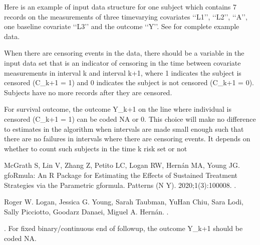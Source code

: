 \documentclass[letterpaper,10pt,english]{sphinxmanual}
\begin{document}
\sphinxAtStartPar
Here is an example of input data structure for one subject which contains 7 records on
the measurements of three time\sphinxhyphen{}varying covariates ‘‘L1’’, ‘‘L2’’, ‘‘A’’,
one baseline covariate ‘‘L3’’ and the outcome ‘‘Y’’. See  for complete example data.
\begin{quote}

\end{quote}

\sphinxAtStartPar
{} When there are censoring events in the data, there should be a variable in the input data set that is an
indicator of censoring in the time between covariate measurements in interval k and interval k+1, where
1 indicates the subject is censored (C\_k+1 = 1) and 0 indicates the subject is not censored (C\_k+1 = 0).
Subjects have no more records after they are censored.

\sphinxAtStartPar
For survival outcome, the outcome Y\_k+1 on the line where individual is censored (C\_k+1 = 1) can be coded NA or 0.
This choice will make no difference to estimates in the algorithm when intervals are made small enough
such that there are no failures in intervals where there are censoring events. It depends on
whether to count such subjects in the time k risk set or not \sphinxstepexplicit %
\begin{footnote}[1]\label{\thesphinxscope.1}%
\sphinxAtStartFootnote
McGrath S, Lin V, Zhang Z, Petito LC, Logan RW, Hernán MA, Young JG. gfoRmula: An R Package for Estimating the Effects of Sustained Treatment Strategies via the Parametric g\sphinxhyphen{}formula. Patterns (N Y). 2020;1(3):100008. .
%
\end{footnote} \sphinxstepexplicit %
\begin{footnote}[2]\label{\thesphinxscope.2}%
\sphinxAtStartFootnote
Roger W. Logan, Jessica G. Young, Sarah Taubman, Yu\sphinxhyphen{}Han Chiu, Sara Lodi, Sally Picciotto, Goodarz Danaei, Miguel A. Hernán. .
%
\end{footnote}. For fixed binary/continuous end of follow\sphinxhyphen{}up, the
outcome Y\_k+1 should be coded NA.
\end{document}

